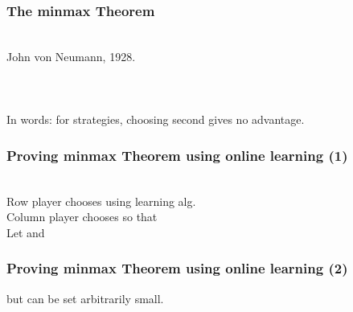 \documentclass[handout]{beamer}
\begin{document}
\begin{frame}
\frametitle{The minmax Theorem}
~\\
John von Neumann, 1928.
\\ ~ \\ \pause
\R{\[ \minp \maxq \mpq = \maxq \minp \mpq \]}
\\ ~ \\ \pause
In words: for  strategies, choosing second gives no advantage.
\end{frame}

\begin{frame}
\frametitle{Proving minmax Theorem using online learning (1)}
~\\
Row player chooses  using learning alg. \\ \pause 
Column player chooses   so that
\R{$\Qt = \arg \maxq \mptq$}
\\ \pause
Let  and
\\ \pause
\R{\em
\[
\begin{array}{rcll}
{\displaystyle{\minp \maxq \trans{\P}\M\Q}} 
 &\leq&
\displaystyle{\maxq \trans{\Pa}\M\Q} & \nextline
\pause
  &=&
\displaystyle{\maxq \frac{1}{T} \sumt \trans{\Pt}\M\Q}
                       &\mbox{\rm by definition of~~\Pa}\nextline
\pause
  &\leq&
\displaystyle{\frac{1}{T} \sumt \maxq \trans{\Pt}\M\Q} &
\end{array}
\]
}
\end{frame}


\begin{frame}
\frametitle{Proving minmax Theorem using online learning (2)}
\R{\em
\[
\begin{array}{rcll}
  &=&
\displaystyle{\frac{1}{T} \sumt \trans{\Pt}\M\Qt}
                       &\mbox{\rm by definition of~~\Qt}\nextline
\pause
  &\leq&
\displaystyle{\minp \frac{1}{T} \sumt \trans{\P}\M\Qt + \delt}
                       &\mbox{\rm by the Corollary} \nextline
\pause
  &=&
\displaystyle{\minp \trans{\P}\M\Qa + \delt}
                       &\mbox{\rm by definition of~~\Qa}\nextline
\pause
  &\leq&
\displaystyle{\maxq \minp \trans{\P}\M\Q + \delt.} &
\end{array}
\]
}
\pause
but \R{$\delt$} can be set arbitrarily small.

\end{frame}
\end{document}
